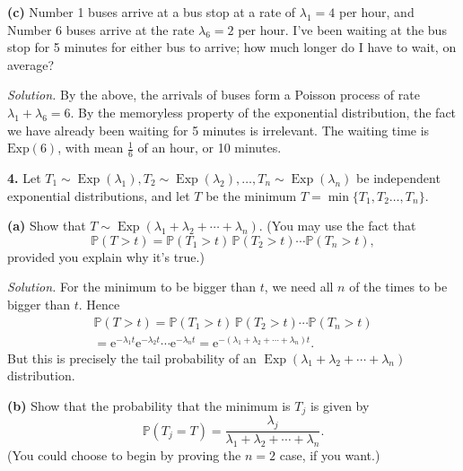 \documentclass[
  a4paper,
]{article}
\theoremstyle{definition}
\theoremstyle{definition}
\theoremstyle{definition}
\theoremstyle{remark}
\begin{document}
\textbf{(c)} Number 1 buses arrive at a bus stop at a rate of \(\lambda_1 = 4\) per hour, and Number 6 buses arrive at the rate \(\lambda_6 = 2\) per hour. I've been waiting at the bus stop for 5 minutes for either bus to arrive; how much longer do I have to wait, on average?

\begin{myanswers}
\emph{Solution.}
By the above, the arrivals of buses form a Poisson process of rate \(\lambda_1 + \lambda_6 = 6\). By the memoryless property of the exponential distribution, the fact we have already been waiting for 5 minutes is irrelevant. The waiting time is \(\text{Exp}(6)\), with mean \(\frac16\) of an hour, or 10 minutes.

\end{myanswers}

\textbf{4.}
Let \(T_1 \sim \operatorname{Exp}(\lambda_1), T_2 \sim \operatorname{Exp}(\lambda_2), \dots, T_n \sim \operatorname{Exp}(\lambda_n)\) be independent exponential distributions, and let \(T\) be the minimum \(T = \min \{T_1, T_2 \dots, T_n\}\).

\textbf{(a)} Show that \(T \sim \operatorname{Exp}(\lambda_1 + \lambda_2 + \cdots + \lambda_n)\). (You may use the fact that
\[ \mathbb P(T > t) = \mathbb P(T_1 > t) \, \mathbb P(T_2 > t) \cdots \mathbb P(T_n > t) , \]
provided you explain why it's true.)

\begin{myanswers}
\emph{Solution.}
For the minimum to be bigger than \(t\), we need all \(n\) of the times to be bigger than \(t\). Hence
\begin{multline*} \mathbb P(T > t) = \mathbb P(T_1 > t)  \, \mathbb P(T_2 > t)\cdots   \mathbb P(T_n > t)\\ = \mathrm{e}^{-\lambda_1 t} \mathrm{e}^{-\lambda_2 t} \cdots \mathrm{e}^{-\lambda_n t} = \mathrm{e}^{-(\lambda_1 + \lambda_2 + \cdots + \lambda_n) t} . \end{multline*}
But this is precisely the tail probability of an \(\operatorname{Exp}(\lambda_1 + \lambda_2 + \cdots + \lambda_n)\) distribution.

\end{myanswers}

\textbf{(b)} Show that the probability that the minimum is \(T_j\) is given by
\[ \mathbb P(T_j = T) = \frac{\lambda_j}{\lambda_1 + \lambda_2 + \cdots + \lambda_n} . \]
(You could choose to begin by proving the \(n = 2\) case, if you want.)
\end{document}
